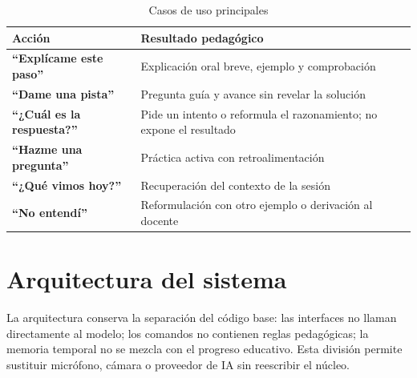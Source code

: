 \documentclass[letterpaper,11pt]{article}
\begin{document}
\begin{table}[H]
\centering
\caption{Casos de uso principales}
\begin{tabularx}{\textwidth}{@{}>{\bfseries}p{1.55in}X@{}}
\toprule
Acción & Resultado pedagógico \\
\midrule
``Explícame este paso'' & Explicación oral breve, ejemplo y comprobación \\
``Dame una pista'' & Pregunta guía y avance sin revelar la solución \\
``¿Cuál es la respuesta?'' & Pide un intento o reformula el razonamiento; no expone el resultado \\
``Hazme una pregunta'' & Práctica activa con retroalimentación \\
``¿Qué vimos hoy?'' & Recuperación del contexto de la sesión \\
``No entendí'' & Reformulación con otro ejemplo o derivación al docente \\
\bottomrule
\end{tabularx}
\end{table}

\clearpage

\section{Arquitectura del sistema}

La arquitectura conserva la separación del código base: las interfaces no llaman directamente al modelo; los comandos no contienen reglas pedagógicas; la memoria temporal no se mezcla con el progreso educativo. Esta división permite sustituir micrófono, cámara o proveedor de IA sin reescribir el núcleo.
\end{document}
